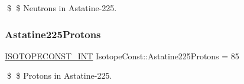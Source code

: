 \$ \$ Neutrons in Astatine-\/225. \mbox{\label{group___isotope_const-_astatine-_at225_ga6018cf1808e6bab5e8fb52839db77f6d}} 
\subsubsection{\texorpdfstring{Astatine225\+Protons}{Astatine225Protons}}
{\footnotesize\ttfamily \mbox{\hyperlink{group___isotope_const-_macros_ga5f18360b3e99483a35c32d789e62621c}{I\+S\+O\+T\+O\+P\+E\+C\+O\+N\+S\+T\+\_\+\+I\+NT}} Isotope\+Const\+::\+Astatine225\+Protons = 85}

\$ \$ Protons in Astatine-\/225. 